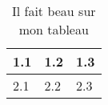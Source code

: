 \documentclass{article}
\begin{document}
\begin{table}[h]
\begin{center}
\begin{tabular}{lll}
\hline
   1.1 & 1.2 & 1.3 \\
\hline
   2.1 & 2.2 & 2.3 \\
\hline
\end{tabular}
\end{center}
\caption{Il fait beau sur mon tableau}
\end{table}
\end{document}
